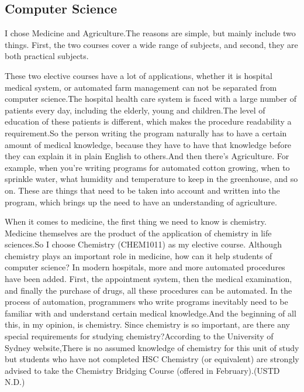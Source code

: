 \documentclass[12pt]{article}
\begin{document}
\subsection{Computer Science}
I chose Medicine and Agriculture.The reasons are simple, but mainly include two things. First, the two courses cover a wide range of subjects, and second, they are both practical subjects.

These two elective courses have a lot of applications, whether it is hospital medical system, or automated farm management can not be separated from computer science.The hospital health care system is faced with a large number of patients every day, including the elderly, young and children.The level of education of these patients is different, which makes the procedure readability a requirement.So the person writing the program naturally has to have a certain amount of medical knowledge, because they have to have that knowledge before they can explain it in plain English to others.And then there's Agriculture. For example, when you're writing programs for automated cotton growing, when to sprinkle water, what humidity and temperature to keep in the greenhouse, and so on. These are things that need to be taken into account and written into the program, which brings up the need to have an understanding of agriculture.

When it comes to medicine, the first thing we need to know is chemistry. Medicine themselves are the product of the application of chemistry in life sciences.So I choose Chemistry (CHEM1011) as my elective course. Although chemistry plays an important role in medicine, how can it help students of computer science? In modern hospitals, more and more automated procedures have been added. First, the appointment system, then the medical examination, and finally the purchase of drugs, all these procedures can be automated. In the process of automation, programmers who write programs inevitably need to be familiar with and understand certain medical knowledge.And the beginning of all this, in my opinion, is chemistry. Since chemistry is so important, are there any special requirements for studying chemistry?According to the University of Sydney website,There is no assumed knowledge of chemistry for this unit of study but students who have not completed HSC Chemistry (or equivalent) are strongly advised to take the Chemistry Bridging Course (offered in February).(USTD N.D.)
\end{document}
